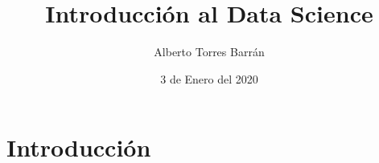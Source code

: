 \documentclass{beamer}
\title{Introducción al Data Science}
\author{Alberto Torres Barrán}
\date{3 de Enero del 2020}
\begin{document}
\begin{frame}[plain]
\titlepage
\end{frame}

%

\section{Introducción}

%
%
%
%
%
%
%
\end{document}
